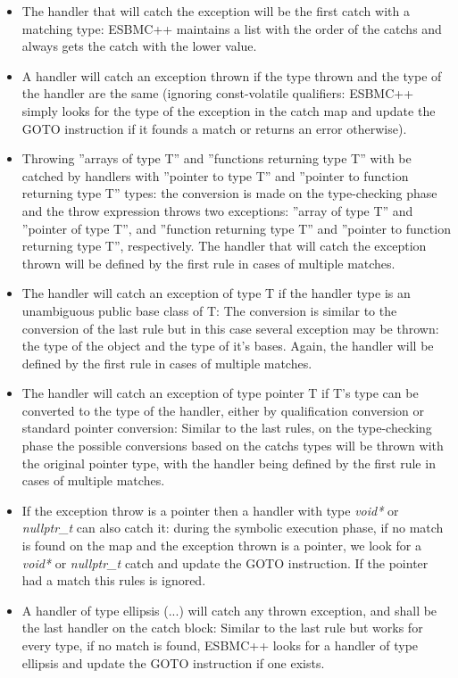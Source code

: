 \documentclass[a4paper]{llncs}
\begin{document}
\begin{itemize}
 \item The handler that will catch the exception will be the first catch with a matching type: ESBMC++ maintains a list with the order of
       the catchs and always gets the catch with the lower value.
 \item A handler will catch an exception thrown if the type thrown and the type of the handler are the same (ignoring const-volatile
       qualifiers: ESBMC++ simply looks for the type of the exception in the catch map and update the GOTO instruction if it founds a
       match or returns an error otherwise).
 \item Throwing ''arrays of type T'' and ''functions returning type T'' with be catched by handlers with ''pointer to type T'' and
       ''pointer to function returning type T'' types: the conversion is made on the type-checking phase and the throw expression throws
       two exceptions: ''array of type T'' and ''pointer of type T'', and ''function returning type T'' and ''pointer to function returning
       type T'', respectively. The handler that will catch the exception thrown will be defined by the first rule in cases of multiple
       matches.
 \item The handler will catch an exception of type T if the handler type is an unambiguous public base class of T: The conversion is similar
       to the conversion of the last rule but in this case several exception may be thrown: the type of the object and the type of it's
       bases. Again, the handler will be defined by the first rule in cases of multiple matches.
 \item The handler will catch an exception of type pointer T if T's type can be converted to the type of the handler, either by
       qualification conversion or standard pointer conversion: Similar to the last rules, on the type-checking phase the possible
       conversions based on the catchs types will be thrown with the original pointer type, with the handler being defined by the first rule
       in cases of multiple matches.
 \item If the exception throw is a pointer then a handler with type \textit{void*} or \textit{nullptr\_t} can also catch it: during the symbolic execution phase, if no match is found on the map and the exception thrown is a pointer, we look for a \textit{void*} or \textit{nullptr\_t} catch and update the GOTO instruction. If the pointer had a match this rules is ignored.
 \item A handler of type ellipsis (...) will catch any thrown exception, and shall be the last handler on the catch block: Similar to the
       last rule but works for every type, if no match is found, ESBMC++ looks for a handler of type ellipsis and update the GOTO
       instruction if one exists.
\end{itemize}
\end{document}
